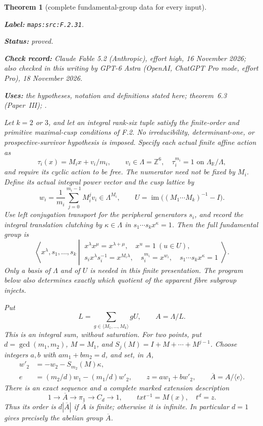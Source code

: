 \documentclass[11pt,a4paper]{article}
\newtheorem{theorem}{Theorem}[section]
\theoremstyle{definition}
\newcommand{\StatementRecord}[4]{\par\smallskip\begingroup\upshape\raggedright\noindent\textbf{Label:} \nolinkurl{#1}.\par\noindent\textbf{Status:} #2.\par\noindent\textbf{Check record:} #3.\par\noindent\textbf{Uses:} #4.\par\endgroup\smallskip}
\newcommand{\CurrentChecker}{GPT-6 Astra (OpenAI, ChatGPT Pro mode, effort Pro), 18 November 2026}
\newcommand{\ExternalPaperRef}[3]{\ifmmode\text{\upshape #1#2 (Paper~#3)}\else #1#2 (Paper~#3)\fi}
\begin{document}
\begin{theorem}[complete fundamental-group data for every input]\label{maps:src:F.2.31}
\StatementRecord{maps:src:F.2.31}{proved}{Claude Fable 5.2 (Anthropic), effort high, 16 November 2026; also checked in this writing by \CurrentChecker}{the hypotheses, notation and definitions stated here; \ExternalPaperRef{theorem~}{6.3}{III}; \cite[Theorems 2.3--2.4, p.~425; Euler-characteristic comparison, pp.~427--428]{rootScott83}}


Let $k=2$ or $3$, and let an integral rank-six tuple satisfy the
finite-order and primitive maximal-cusp conditions of F.2.  No
irreducibility, determinant-one, or prospective-survivor hypothesis is
imposed.  Specify each actual finite affine action as
\[
 \tau_i(x)=M_ix+v_i/m_i,\qquad v_i\in\Lambda=\mathbb Z^6,
 \quad \tau_i^{m_i}=1\text{ on }\Lambda_{\mathbb R}/\Lambda,
 \tag{F.G1}\label{maps:eq:F.G1}
\]
and require its cyclic action to be free.  The numerator need not be
fixed by $M_i$.  Define its actual integral power vector and the cusp
lattice by
\[
 w_i=\frac1{m_i}\sum_{j=0}^{m_i-1}M_i^jv_i\in\Lambda^{M_i},
 \qquad U=\operatorname{im}\bigl((M_1\cdots M_k)^{-1}-I\bigr).
 \tag{F.G2}\label{maps:eq:F.G2}
\]
Use left conjugation transport for the peripheral generators $s_i$,
and record the integral translation clutching by $\kappa\in\Lambda$
in $s_1\cdots s_kx^\kappa=1$.  Then the full fundamental group is
\[
 \left\langle x^\lambda,s_1,\ldots,s_k\ \left|\
 \begin{array}{l}
 x^\lambda x^\mu=x^{\lambda+\mu},\quad x^u=1\ (u\in U),\\
 s_ix^\lambda s_i^{-1}=x^{M_i\lambda},\quad
 s_i^{m_i}=x^{w_i},\quad s_1\cdots s_kx^\kappa=1
 \end{array}\right.\right\rangle .                         \tag{F.G3}\label{maps:eq:F.G3}
\]
Only a basis of $\Lambda$ and of $U$ is needed in this finite
presentation.  The program below also determines exactly which
quotient of the apparent fibre subgroup injects.

Put
\[
 L=\sum_{g\in\langle M_1,\ldots,M_k\rangle}gU,
 \qquad A=\Lambda/L.                                      \tag{F.G4}\label{maps:eq:F.G4}
\]
This is an integral sum, without saturation.  For two points, put
$d=\gcd(m_1,m_2)$, $M=M_1$, and
$S_j(M)=I+M+\cdots+M^{j-1}$.  Choose integers $a,b$ with
$am_1+bm_2=d$, and set, in $A$,
\[
 \begin{split}
 w'_2&=-w_2-S_{m_2}(M)\kappa,\\
 e&=(m_2/d)w_1-(m_1/d)w'_2,\qquad
 z=aw_1+bw'_2,\qquad \overline A=A/\langle e\rangle .
 \end{split}                                             \tag{F.G5}\label{maps:eq:F.G5}
\]
There is an exact sequence and a complete marked extension description
\[
 1\longrightarrow\overline A\longrightarrow\pi_1
   \longrightarrow C_d\longrightarrow1,
 \qquad txt^{-1}=M(x),\quad t^d=z.                         \tag{F.G6}\label{maps:eq:F.G6}
\]
Thus its order is $d|\overline A|$ if $\overline A$ is finite;
otherwise it is infinite.  In particular $d=1$ gives precisely
the abelian group $\overline A$.


\end{theorem}
\end{document}
